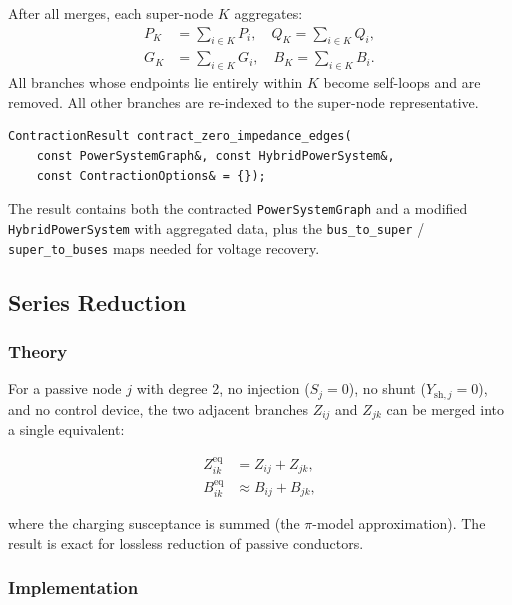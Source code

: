 After all merges, each super-node $K$ aggregates:
\begin{align}
  P_K &= \sum_{i \in K} P_i, \quad Q_K = \sum_{i \in K} Q_i, \\
  G_K &= \sum_{i \in K} G_i, \quad B_K = \sum_{i \in K} B_i.
\end{align}
All branches whose endpoints lie entirely within $K$ become self-loops and
are removed.  All other branches are re-indexed to the super-node
representative.

\begin{verbatim}
ContractionResult contract_zero_impedance_edges(
    const PowerSystemGraph&, const HybridPowerSystem&,
    const ContractionOptions& = {});
\end{verbatim}

The result contains both the contracted \texttt{PowerSystemGraph} and a
modified \texttt{HybridPowerSystem} with aggregated data, plus the
\texttt{bus\_to\_super} / \texttt{super\_to\_buses} maps needed for voltage
recovery.

\subsection{Series Reduction}
\label{sec:graph-series}

\subsubsection{Theory}

For a passive node $j$ with degree 2, no injection ($S_j = 0$), no shunt
($Y_{\text{sh},j} = 0$), and no control device, the two adjacent branches
$Z_{ij}$ and $Z_{jk}$ can be merged into a single equivalent:

\begin{align}
  Z_{ik}^{\text{eq}} &= Z_{ij} + Z_{jk}, \\
  B_{ik}^{\text{eq}} &\approx B_{ij} + B_{jk},
\end{align}

where the charging susceptance is summed (the $\pi$-model approximation).
The result is exact for lossless reduction of passive conductors.

\subsubsection{Implementation}

